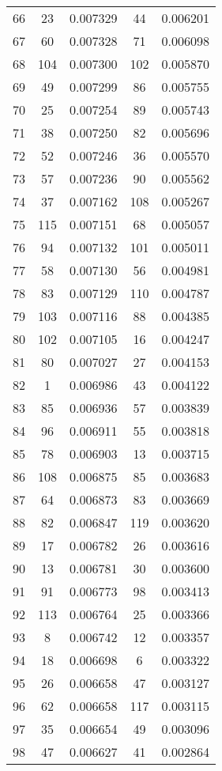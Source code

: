 \documentclass{article}
\begin{document}
\begin{center}
\begin{longtable}{|c|c|c|c|r|}
66 & 23  &0.007329 & 44  & 0.006201 \\ 
67 & 60  &0.007328 & 71  & 0.006098 \\ 
68 & 104  &0.007300 & 102  & 0.005870 \\
69 & 49  &0.007299 & 86  & 0.005755 \\ 
70 & 25  &0.007254 & 89  & 0.005743 \\
71 & 38  &0.007250 & 82  & 0.005696 \\
72 & 52  &0.007246 & 36  & 0.005570 \\ 
73 & 57  &0.007236 & 90  & 0.005562 \\
74 & 37  &0.007162 & 108  & 0.005267 \\ 
75 & 115  &0.007151 & 68  & 0.005057 \\ 
76 & 94  &0.007132 & 101  & 0.005011 \\
77 & 58  &0.007130 & 56  & 0.004981 \\
78 & 83  &0.007129 & 110  & 0.004787 \\
79 & 103  &0.007116  & 88  & 0.004385 \\ 
80 & 102  &0.007105 & 16  & 0.004247 \\ 
81 & 80  &0.007027 & 27  & 0.004153 \\ 
82 & 1  &0.006986 & 43  & 0.004122 \\ 
83 & 85  &0.006936 & 57  & 0.003839 \\ 
84 & 96  &0.006911 & 55  & 0.003818 \\ 
85 & 78  &0.006903 & 13  & 0.003715 \\
86 & 108  &0.006875 & 85  & 0.003683 \\ 
87 & 64  &0.006873 & 83  & 0.003669 \\ 
88 & 82  &0.006847 & 119  & 0.003620 \\ 
89 & 17  &0.006782 & 26  & 0.003616 \\
90 & 13  &0.006781 & 30  & 0.003600 \\ 
91 & 91  &0.006773 & 98  & 0.003413 \\
92 & 113  &0.006764 & 25  & 0.003366 \\ 
93 & 8  &0.006742 & 12  & 0.003357 \\
94 & 18  &0.006698 & 6  & 0.003322 \\ 
95 & 26  &0.006658 & 47  & 0.003127 \\ 
96 & 62  &0.006658 & 117  & 0.003115 \\
97 & 35  &0.006654 & 49  & 0.003096 \\ 
98 & 47  &0.006627 & 41  & 0.002864 \\ 

\end{longtable}
\end{center}
\end{document}
